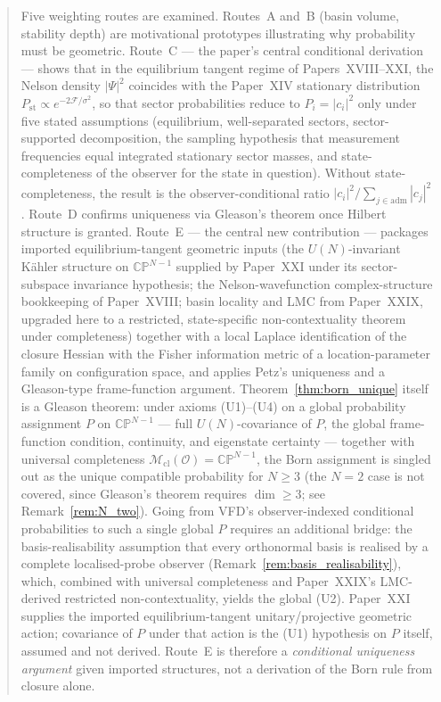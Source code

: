 \documentclass[12pt]{article}
\newcommand{\Fcal}{\mathcal{F}}
\newcommand{\Ocal}{\mathcal{O}}
\newcommand{\Mcl}{\mathcal{M}_{\mathrm{cl}}}
\newcommand{\Pst}{P_{\mathrm{st}}}
\begin{document}
\begin{abstract}
Five weighting routes are examined. Routes~A and~B (basin volume, stability depth) are motivational prototypes illustrating why probability must be geometric. Route~C --- the paper's central conditional derivation --- shows that in the equilibrium tangent regime of Papers~XVIII--XXI, the Nelson density $|\Psi|^2$ coincides with the Paper~XIV stationary distribution $\Pst \propto e^{-2\Fcal/\sigma^2}$, so that sector probabilities reduce to $P_i = |c_i|^2$ only under five stated assumptions (equilibrium, well-separated sectors, sector-supported decomposition, the sampling hypothesis that measurement frequencies equal integrated stationary sector masses, and state-completeness of the observer for the state in question). Without state-completeness, the result is the observer-conditional ratio $|c_i|^2/\sum_{j\in\mathrm{adm}}|c_j|^2$. Route~D confirms uniqueness via Gleason's theorem once Hilbert structure is granted. Route~E --- the central new contribution --- packages imported equilibrium-tangent geometric inputs (the $U(N)$-invariant K\"ahler structure on $\mathbb{CP}^{N-1}$ supplied by Paper~XXI under its sector-subspace invariance hypothesis; the Nelson-wavefunction complex-structure bookkeeping of Paper~XVIII; basin locality and LMC from Paper~XXIX, upgraded here to a restricted, state-specific non-contextuality theorem under completeness) together with a local Laplace identification of the closure Hessian with the Fisher information metric of a location-parameter family on configuration space, and applies Petz's uniqueness and a Gleason-type frame-function argument. Theorem~\ref{thm:born_unique} itself is a Gleason theorem: under axioms (U1)--(U4) on a global probability assignment $P$ on $\mathbb{CP}^{N-1}$ --- full $U(N)$-covariance of $P$, the global frame-function condition, continuity, and eigenstate certainty --- together with universal completeness $\Mcl(\Ocal) = \mathbb{CP}^{N-1}$, the Born assignment is singled out as the unique compatible probability for $N \geq 3$ (the $N = 2$ case is not covered, since Gleason's theorem requires $\dim \geq 3$; see Remark~\ref{rem:N_two}). Going from VFD's observer-indexed conditional probabilities to such a single global $P$ requires an additional bridge: the basis-realisability assumption that every orthonormal basis is realised by a complete localised-probe observer (Remark~\ref{rem:basis_realisability}), which, combined with universal completeness and Paper~XXIX's LMC-derived restricted non-contextuality, yields the global (U2). Paper~XXI supplies the imported equilibrium-tangent unitary/projective geometric action; covariance of $P$ under that action is the (U1) hypothesis on $P$ itself, assumed and not derived. Route~E is therefore a \emph{conditional uniqueness argument} given imported structures, not a derivation of the Born rule from closure alone.


\end{abstract}
\end{document}
